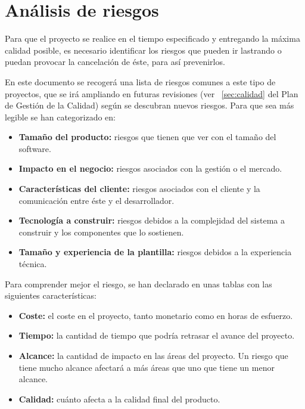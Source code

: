 \chapter{Análisis de riesgos}\label{sec:riesgos}
\par Para que el proyecto se realice en el tiempo especificado y entregando la máxima calidad posible, es necesario identificar los riesgos que pueden ir lastrando o puedan provocar la cancelación de éste, para así prevenirlos.
\par En este documento se recogerá una lista de riesgos comunes a este tipo de proyectos, que se irá ampliando en futuras revisiones (ver ~\ref{sec:calidad} del Plan de Gestión de la Calidad) según se descubran nuevos riesgos. Para que sea más legible se han categorizado en:

\begin{itemize}[-]
\item \textbf{Tamaño del producto:} riesgos que tienen que ver con el tamaño del software.
\item \textbf{Impacto en el negocio:} riesgos asociados con  la gestión o el mercado.
\item \textbf{Características del cliente:} riesgos asociados con el cliente y la comunicación entre éste y el desarrollador.
\item \textbf{Tecnología a construir:} riesgos debidos a la complejidad del sistema a construir y los componentes que lo sostienen.
\item \textbf{Tamaño y experiencia de la plantilla:} riesgos debidos a la experiencia técnica.
\end{itemize}

\par Para comprender mejor el riesgo, se han declarado en unas tablas con las siguientes características:
\begin{itemize}
	\item \textbf{Coste:} el coste en el proyecto, tanto monetario como en horas de esfuerzo.
	\item \textbf{Tiempo:} la cantidad de tiempo que podría retrasar el avance del proyecto.
	\item \textbf{Alcance:} la cantidad de impacto en las áreas del proyecto. Un riesgo que tiene mucho alcance afectará a más áreas que uno que tiene un menor alcance.
	\item \textbf{Calidad:} cuánto afecta a la calidad final del producto.
\end{itemize}

